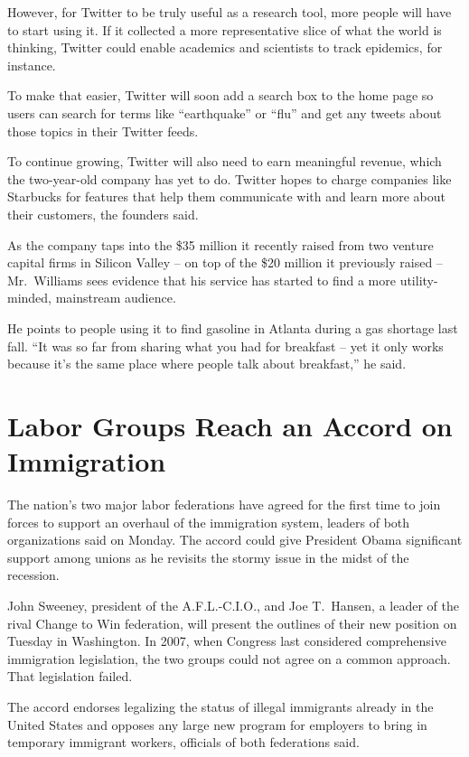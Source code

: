 \documentclass[12pt,a4paper,onecolumn]{article}
\begin{document}
However, for Twitter to be truly useful as a research tool, more people will have to start using it.
If it collected a more representative slice of what the world is thinking, Twitter could enable
academics and scientists to track epidemics, for instance.

To make that easier, Twitter will soon add a search box to the home page so users can search for
terms like ``earthquake'' or ``flu'' and get any tweets about those topics in their Twitter feeds.

To continue growing, Twitter will also need to earn meaningful revenue, which the two-year-old
company has yet to do. Twitter hopes to charge companies like Starbucks for features that help them
communicate with and learn more about their customers, the founders said.

As the company taps into the \$35 million it recently raised from two venture capital firms in
Silicon Valley -- on top of the \$20 million it previously raised -- Mr.~Williams sees evidence that
his service has started to find a more utility-minded, mainstream audience.

He points to people using it to find gasoline in Atlanta during a gas shortage last fall. ``It was
so far from sharing what you had for breakfast -- yet it only works because it's the same place
where people talk about breakfast,'' he said.

\section{Labor Groups Reach an Accord on Immigration}

The nation's two major labor federations have agreed for the first time to join forces to support an
overhaul of the immigration system, leaders of both organizations said on Monday. The accord could
give President Obama significant support among unions as he revisits the stormy issue in the midst
of the recession.

John Sweeney, president of the A.F.L.-C.I.O., and Joe T.~Hansen, a leader of the rival Change to Win
federation, will present the outlines of their new position on Tuesday in Washington. In 2007, when
Congress last considered comprehensive immigration legislation, the two groups could not agree on a
common approach. That legislation failed.

The accord endorses legalizing the status of illegal immigrants already in the United States and
opposes any large new program for employers to bring in temporary immigrant workers, officials of
both federations said.
\end{document}
